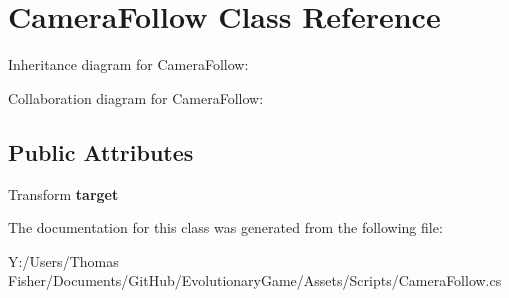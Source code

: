 \hypertarget{class_camera_follow}{}\section{Camera\+Follow Class Reference}
\label{class_camera_follow}


Inheritance diagram for Camera\+Follow\+:


Collaboration diagram for Camera\+Follow\+:
\subsection*{Public Attributes}
\begin{DoxyCompactItemize}
\item 
\mbox{\label{class_camera_follow_a2ef2d3655fd0cb86d18e6324b75c0a59}} 
Transform {\bfseries target}
\end{DoxyCompactItemize}


The documentation for this class was generated from the following file\+:\begin{DoxyCompactItemize}
\item 
Y\+:/\+Users/\+Thomas Fisher/\+Documents/\+Git\+Hub/\+Evolutionary\+Game/\+Assets/\+Scripts/Camera\+Follow.\+cs\end{DoxyCompactItemize}
